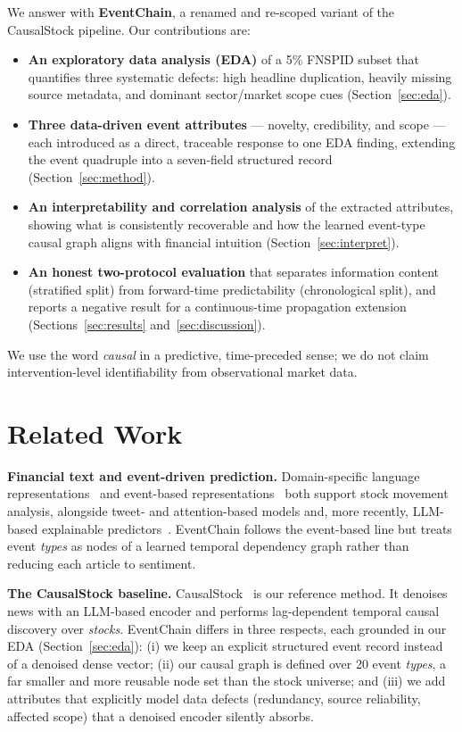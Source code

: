 \documentclass[sigconf,nonacm]{acmart}
\begin{document}
We answer with \textbf{EventChain}, a renamed and re-scoped variant of
the CausalStock pipeline. Our contributions are:
\begin{itemize}
\item \textbf{An exploratory data analysis (EDA)} of a 5\% FNSPID subset
that quantifies three systematic defects: high headline duplication,
heavily missing source metadata, and dominant sector/market scope cues
(Section~\ref{sec:eda}).
\item \textbf{Three data-driven event attributes} --- novelty,
credibility, and scope --- each introduced as a direct, traceable
response to one EDA finding, extending the event quadruple into a
seven-field structured record (Section~\ref{sec:method}).
\item \textbf{An interpretability and correlation analysis} of the
extracted attributes, showing what is consistently recoverable and how
the learned event-type causal graph aligns with financial intuition
(Section~\ref{sec:interpret}).
\item \textbf{An honest two-protocol evaluation} that separates
information content (stratified split) from forward-time predictability
(chronological split), and reports a negative result for a
continuous-time propagation extension (Sections~\ref{sec:results}
and~\ref{sec:discussion}).
\end{itemize}
We use the word \emph{causal} in a predictive, time-preceded sense; we do
not claim intervention-level identifiability from observational market
data.

\section{Related Work}
\textbf{Financial text and event-driven prediction.}
Domain-specific language representations~\cite{finbert} and event-based
representations~\cite{ding2014,ding2015,chen2019,zhou2021} both support
stock movement analysis, alongside tweet- and attention-based models
\cite{xu2018,hu2018,sawhney2020,sawhney2021,xu2021} and, more recently,
LLM-based explainable predictors~\cite{koa2024}. EventChain follows the
event-based line but treats event \emph{types} as nodes of a learned
temporal dependency graph rather than reducing each article to sentiment.

\textbf{The CausalStock baseline.}
CausalStock~\cite{causalstock} is our reference method. It denoises news
with an LLM-based encoder and performs lag-dependent temporal causal
discovery over \emph{stocks}. EventChain differs in three respects, each
grounded in our EDA (Section~\ref{sec:eda}): (i) we keep an explicit
structured event record instead of a denoised dense vector; (ii) our
causal graph is defined over 20 event \emph{types}, a far smaller and
more reusable node set than the stock universe; and (iii) we add
attributes that explicitly model data defects (redundancy, source
reliability, affected scope) that a denoised encoder silently absorbs.
\end{document}
